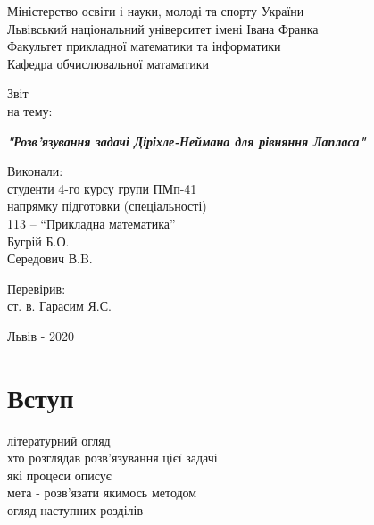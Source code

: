 \documentclass[14pt,a4paper]{extarticle}
\newcounter{e}
\newcounter{tabl}
\numberwithin{equation}{section}
\begin{document}
	

 \thispagestyle{empty}

 \begin{center}
	\large
	Міністерство освіти і науки, молоді та спорту України \\
	Львівський національний університет імені Івана Франка \\
	Факультет прикладної математики та інформатики \\
	Кафедра обчислювальної матаматики
 \end{center}

 \vspace{45pt}

 \vfill

 \begin{center}
	{\Huge{Звіт}}\\
	{\large на тему:}
 \end{center}

 \begin{center}\Large
	\textbf{\emph{"Розв'язування задачі Діріхле-Неймана для рівняння Лапласа"}}
 \end{center}

 \vfill
 \vskip100pt

 \begin{flushleft}
	\hskip8cm 
	Виконали:
	\\ \hskip8cm 
	студенти 4-го курсу групи ПМп-41
	\\ \hskip8cm
	напрямку підготовки (спеціальності)
	\\ \hskip8cm
	113 -- ``Прикладна математика''
	\\ \hskip8cm
	Бугрій Б.О.
	\\ \hskip8cm
	Середович В.B.
 \end{flushleft}

 \begin{flushleft}
	\hskip8cm 
	Перевірив:
	\\ \hskip8cm
	ст. в. Гарасим Я.С.
 \end{flushleft}

 \vfill

 \begin{center}
	\large
	Львів - 2020
 \end{center}

 \newpage
 \thispagestyle{empty}
 \tableofcontents

 \newpage
 \thispagestyle{empty}
 \section*{Вступ}
 \begin{center}\end{center}
 літературний огляд \\
 хто розглядав розв'язування цієї задачі \\
 які процеси описує \\
 мета - розв'язати якимось методом \\
 огляд наступних розділів
\end{document}
